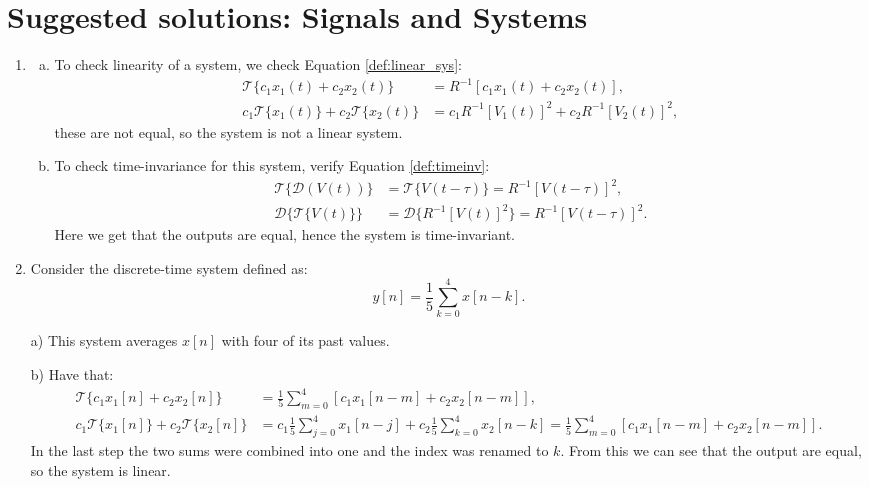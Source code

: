 \newpage
\section{Suggested solutions: Signals and Systems}
\begin{enumerate}
\item

\begin{enumerate}[a)]
\item To check linearity of a system, we check Equation \ref{def:linear_sys}:
\begin{align*}
    \mathcal{T}\{c_{1}x_{1}(t)+c_{2}x_{2}(t)\}&=R^{-1}[c_{1}x_{1}(t)+c_{2}x_{2}(t)], \\
    c_{1}\mathcal{T}\{x_{1}(t)\}+c_{2}\mathcal{T}\{x_{2}(t)\} &=c_{1}R^{-1}[V_{1}(t)]^{2} + c_{2}R^{-1}[V_{2}(t)]^{2},
\end{align*}
these are not equal, so the system is not a linear system. 

\item To check time-invariance for this system, verify Equation \ref{def:timeinv}:
\begin{align*}
    \mathcal{T}\{\mathcal{D}(V(t))\}&=\mathcal{T}\{V(t-\tau)\}=R^{-1}[V(t-\tau)]^{2}, \\
    \mathcal{D}\{\mathcal{T}\{V(t)\}\}&=\mathcal{D}\{R^{-1}[V(t)]^{2}\}=R^{-1}[V(t-\tau)]^{2}.
\end{align*}
Here we get that the outputs are equal, hence the system is time-invariant. 
\end{enumerate}

\item
Consider the discrete-time system defined as:
$$y[n]=\frac{1}{5}\sum_{k=0}^{4}x[n-k].$$

\item[a)]
This system averages $x[n]$ with four of its past values. 

\item[b)] Have that:
\begin{align*}
    \mathcal{T}\{c_{1}x_{1}[n]+c_{2}x_{2}[n]\} &= \frac{1}{5}\sum_{m=0}^{4}[c_{1}x_{1}[n-m]+c_{2}x_{2}[n-m]], \\
    c_{1}\mathcal{T}\{x_{1}[n]\}+c_{2}\mathcal{T}\{x_{2}[n]\}&=c_{1}\frac{1}{5}\sum_{j=0}^{4}x_{1}[n-j]+c_{2}\frac{1}{5}\sum_{k=0}^{4}x_{2}[n-k]
    =\frac{1}{5}\sum_{m=0}^{4}[c_{1}x_{1}[n-m]+c_{2}x_{2}[n-m]].
\end{align*}
In the last step the two sums were combined into one and the index was renamed to $k$. 
From this we can see that the output are equal, so the system is linear. 


\end{enumerate}
